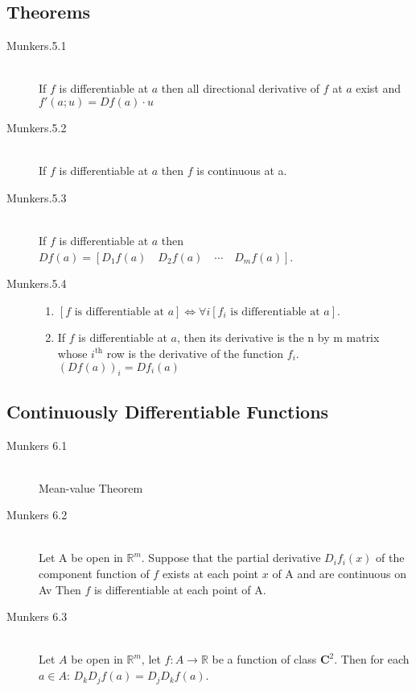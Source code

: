 \subsection{Theorems}
\begin{description}
	\item[Munkers.5.1] \hfill \\
		If $f$ is differentiable at $a$ then all directional
		derivative of $f$ at $a$ exist and
		$f'(a;u)=Df(a)\cdot u$
		
	\item[Munkers.5.2] \hfill \\
		If $f$ is differentiable at $a$ then $f$ is continuous at a.
		
	\item[Munkers.5.3] \hfill \\
		If $f$ is differentiable at $a$
		then $Df(a)=[D_1f(a) \quad D_2f(a) \quad \cdots \quad D_mf(a)]$.
		
	\item[Munkers.5.4] \hfill
	\begin{enumerate}
		\renewcommand{\labelenumi}{\alph{enumi}.}
		\item
		$[f \textrm{ is differentiable at } a ]
			\Leftrightarrow
			\forall i [f_i \textrm{ is differentiable at } a]$.
			
		\item
		If $f$ is differentiable at $a$, then its derivative is the n by m
		matrix whose $i^\textrm{th}$ row is the derivative of the function $f_i$. $(Df(a))_{i} = Df_i(a)$
	\end{enumerate}
\end{description}

\subsection{Continuously Differentiable Functions}

\begin{description}
	\item[Munkers 6.1] \hfill \\
		Mean-value Theorem
		
	\item[Munkers 6.2] \hfill \\
		Let A be open in $\mathbb{R}^m$.
		Suppose that the partial derivative
		$D_if_i(x)$ of the component function
		of $f$ exists at each point $x$ of A and are continuous on Av
		Then $f$ is differentiable at each point of A.
		
	\item[Munkers 6.3] \hfill \\
		Let $A$ be open in $\mathbb{R}^m$, let $f: A \to \mathbb{R}$
		be a function of class $\mathbf{C}^2$. Then for each $a\in A$:
		$D_kD_jf(a)=D_jD_kf(a)$.
\end{description}

